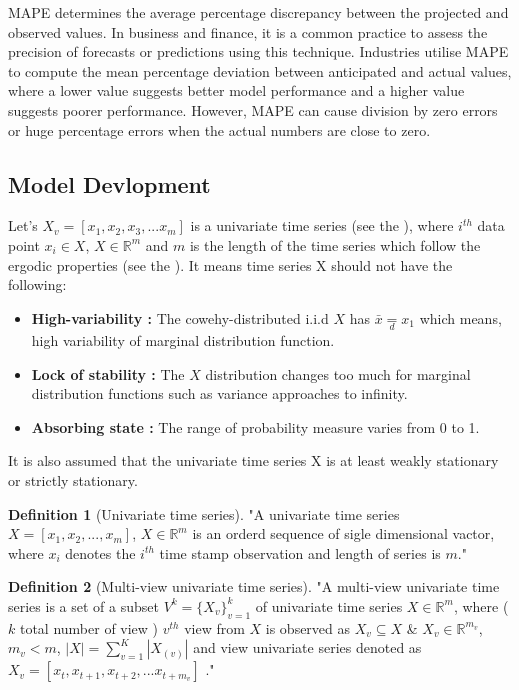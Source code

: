 \documentclass[a4paper, fleqn]{cas-sc}
\theoremstyle{definition}
\newtheorem{definition}{Definition}[section]
\theoremstyle{remark}
\begin{document}
MAPE determines the average percentage discrepancy between the projected and observed values. In business and finance,  it is a common practice to assess the precision of forecasts or predictions using this technique. Industries utilise MAPE to compute the mean percentage deviation between anticipated and actual values,  where a lower value suggests better model performance and a higher value suggests poorer performance. However,  MAPE can cause division by zero errors or huge percentage errors when the actual numbers are close to zero.




\subsection{Model Devlopment}
Let's $X_v=[ x_1, x_2, x_3, ... x_m]$ is a univariate time series (see the ),  where $i^{th}$ data point $x_i \in X$,  $X \in \mathbb{R}^m$ and $m$ is the length of the time series which follow the ergodic properties (see the ). It means time series X should not have the following: 

\begin{itemize}
  \item \textbf{High-variability : } The cowehy-distributed i.i.d $X $ has $\bar{x}\underset{d}{=} x_1$ which means,  high variability of marginal distribution function.
  \item \textbf{Lock of stability : } The $X$ distribution changes too much for marginal distribution functions such as variance approaches to infinity.
  \item \textbf{Absorbing state : } The range of probability measure varies from 0 to 1.
\end{itemize}
It is also assumed that the univariate time series X is at least weakly stationary or strictly stationary.






\begin{definition}[Univariate time series] \label{univts}
"A univariate time series $X=[x_1, x_2, ..., x_m]$,  $X\in \mathbb{R}^m$ is an orderd sequence of sigle dimensional vactor,  where $x_i$ denotes the $i^{th}$ time stamp observation and length of series is $m$."
  \end{definition}

  \begin{definition}[Multi-view univariate time series]\label{mvts}
    "A multi-view univariate time series is a set of a subset $V^k= \{X_{v} \}_{v=1}^k$ of univariate time series $X\in \mathbb{R}^m$,  where ($k$ total number of view ) $v^{th}$ view from $X$ is observed as $X_v \subseteq X$ \& $X_v \in \mathbb{R}^{m_v}$,  $m_{v} < m$,  $\left|X  \right|= \sum_{v=1}^{K} \left| X_{(v)} \right|$ and view univariate series denoted as $X_v=[ x_t, x_{t+1}, x_{t+2}, ... x_{t+m_v} ]$ ."
    \end{definition} 
\end{document}
